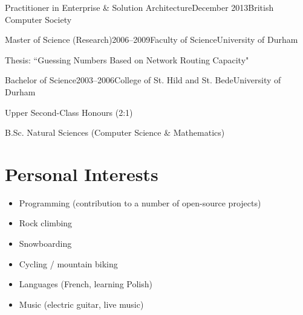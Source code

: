 \documentclass{cv}
\begin{document}
\begin{experienceplain}{Practitioner in Enterprise \& Solution Architecture}{December 2013}{British Computer Society}{}
\end{experienceplain}

\begin{experience}{Master of Science (Research)}{2006--2009}{Faculty of Science}{University of Durham}
\item Thesis: ``Guessing Numbers Based on Network Routing Capacity"
\end{experience}

\begin{experience}{Bachelor of Science}{2003--2006}{College of St. Hild and St. Bede}{University of Durham}
\item Upper Second-Class Honours (2:1)
\item B.Sc. Natural Sciences (Computer Science \& Mathematics)
\end{experience}


\section{Personal Interests}

\begin{itemize}
\item Programming (contribution to a number of open-source projects)
\item Rock climbing
\item Snowboarding
\item Cycling / mountain biking
\item Languages (French, learning Polish)
\item Music (electric guitar, live music)
\end{itemize}
\end{document}
